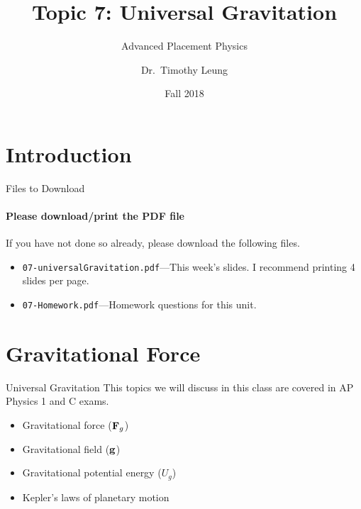 \documentclass[12pt,compress,aspectratio=169]{beamer}
\title{Topic 7: Universal Gravitation}
\subtitle{Advanced Placement Physics}
\author[TML]{Dr.\ Timothy Leung}
\institute{Olympiads School}
\date{Fall 2018}
\newcommand{\mb}[1]{\ensuremath\mathbf{#1}}
\begin{document}
\begin{frame}
  \maketitle
\end{frame}


\section[Intro]{Introduction}

\begin{frame}{Files to Download}
  \framesubtitle{Please download/print the PDF file}
  If you have not done so already, please download the following files.
  \begin{itemize}
  \item\texttt{07-universalGravitation.pdf}---This week's
    slides. I recommend printing 4 slides per page.
  \item\texttt{07-Homework.pdf}---Homework questions for this unit.
  \end{itemize}
\end{frame}



\section{Gravitational Force}

\begin{frame}{Universal Gravitation}
  This topics we will discuss in this class are covered in AP Physics 1 and
  C exams.
  \begin{itemize}
  \item Gravitational force ($\mb{F}_g$)
  \item Gravitational field ($\mb{g}$)
  \item Gravitational potential energy  ($U_g$)
  \item Kepler's laws of planetary motion
  \end{itemize}
\end{frame}
\end{document}
